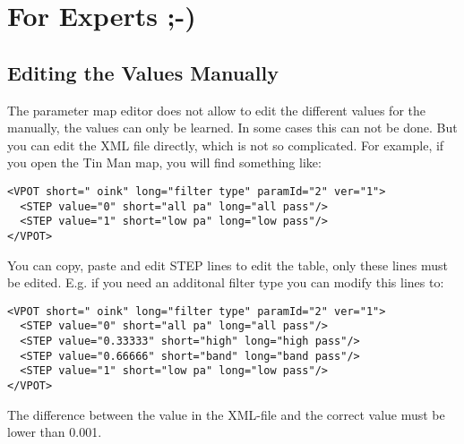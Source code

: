 \section{For Experts ;-)} 

\subsection{Editing the \vpot Values Manually}

The parameter map editor does not allow to edit the different values for the
\vpot manually,  the values can  only be learned. In some cases this
can not be done. But you can edit the XML file directly, which is not so
complicated. For example, if you open the Tin Man map, you will find something like:
 
\begin{verbatim} 
<VPOT short=" oink" long="filter type" paramId="2" ver="1">
  <STEP value="0" short="all pa" long="all pass"/>
  <STEP value="1" short="low pa" long="low pass"/>
</VPOT>
\end{verbatim} 
 
You can copy, paste and edit STEP lines to edit the table, only these
lines must be edited. E.g. if you need an additonal filter type you
can modify this lines to:


\begin{verbatim} 
<VPOT short=" oink" long="filter type" paramId="2" ver="1">
  <STEP value="0" short="all pa" long="all pass"/>
  <STEP value="0.33333" short="high" long="high pass"/>
  <STEP value="0.66666" short="band" long="band pass"/>
  <STEP value="1" short="low pa" long="low pass"/>
</VPOT>
\end{verbatim} 
 
The difference between the value in the XML-file and the correct value
must be lower than 0.001.

